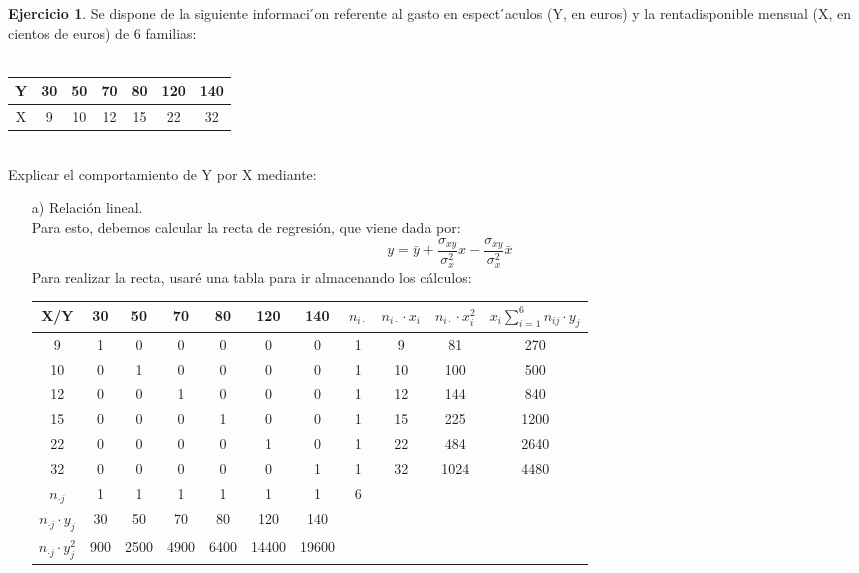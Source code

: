 \documentclass[a4paper, 12pt]{article}
\theoremstyle{definition}
\newtheorem{ej}{Ejercicio}
\begin{document}
\begin{ej}
Se dispone de la siguiente informaci ́on referente al gasto en espect ́aculos (Y, en euros) y la rentadisponible mensual (X, en cientos de euros) de 6 familias: \\ \\
\centering
\begin{tabular}{c|cccccc}
    Y & 30 & 50 & 70 & 80 & 120 & 140\\ \hline
    X & 9 & 10 & 12 & 15 & 22 & 32
\end{tabular} \\
Explicar el comportamiento de Y por X mediante: \\
\begin{enumerate}
    \item[a) ] Relación lineal. \\
    Para esto, debemos calcular la recta de regresión, que viene dada por:
    $$y = \bar{y} + \frac{\sigma_{xy}}{\sigma_x^2}x - \frac{\sigma_{xy}}{\sigma_x^2}\bar{x}$$
    Para realizar la recta, usaré una tabla para ir almacenando los cálculos: \\
    \begin{tabular}{c|cccccccccc}
    X/Y & 30 & 50 & 70 & 80 & 120 & 140 & $n_{i \cdot}$ & $n_{i \cdot} \cdot x_i$ &  $n_{i \cdot} \cdot x_i^2$ & $x_i \displaystyle \sum_{i = 1}^6 n_{ij} \cdot y_j$\\ \hline
    9 & 1 & 0 & 0 & 0 & 0 & 0 & 1 & 9 & 81 & 270 \\
    10 & 0 & 1 & 0 & 0 & 0 & 0 & 1 & 10 & 100 & 500 \\
    12 & 0 & 0 & 1 & 0 & 0 & 0 & 1 & 12& 144 & 840 \\
    15 & 0 & 0 & 0 & 1 & 0 & 0 & 1 & 15 & 225 & 1200 \\
    22 & 0 & 0 & 0 & 0 & 1 & 0 & 1 & 22 & 484 & 2640 \\
    32 & 0 & 0 & 0 & 0 & 0 & 1 & 1 & 32 & 1024 & 4480 \\
    $n_{\cdot j}$ & 1 & 1 & 1 & 1 & 1 & 1 & 6 & & & \vline 9930 \vline \\
    $n_{\cdot j} \cdot y_j$ & 30 & 50 & 70 & 80 & 120 & 140 & & & &\\
    $n_{\cdot j} \cdot y_j^2$ & 900 & 2500 & 4900 & 6400 & 14400 & 19600
    \end{tabular}
    

\end{enumerate}
\end{ej}
\end{document}
